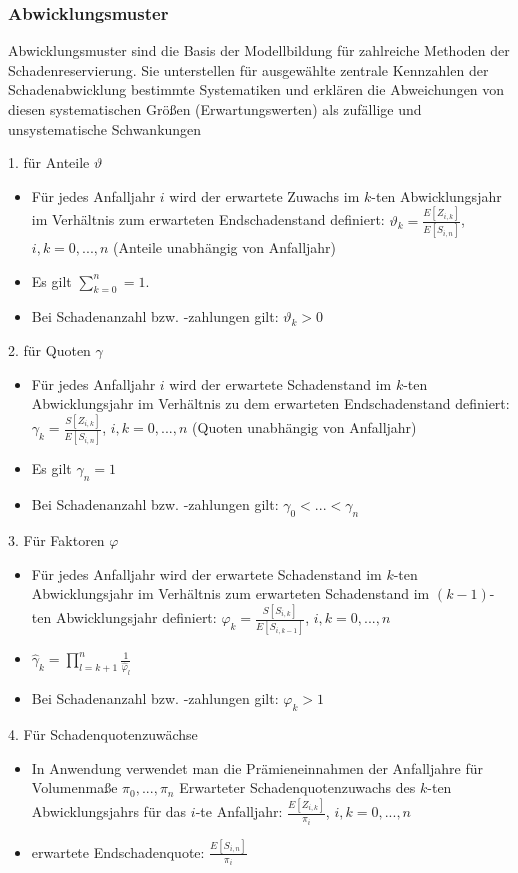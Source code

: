 \documentclass[12pt]{report}
\theoremstyle{dotless}
\theoremstyle{definition}
\begin{document}
\subsubsection{Abwicklungsmuster}

Abwicklungsmuster sind die Basis der Modellbildung für zahlreiche
Methoden der Schadenreservierung. Sie unterstellen für ausgewählte zentrale Kennzahlen der Schadenabwicklung bestimmte Systematiken und erklären
die Abweichungen von diesen systematischen Größen (Erwartungswerten) als
zufällige und unsystematische Schwankungen

1. für Anteile $\vartheta$
\begin{itemize}
\item Für jedes Anfalljahr $i$ wird der erwartete Zuwachs im $k$-ten Abwicklungsjahr im Verhältnis zum erwarteten Endschadenstand definiert: $\vartheta_k = \frac{E[Z_{i,k}]}{E[S_{i,n}]}$, $i,k=0,...,n$ (Anteile unabhängig von Anfalljahr)
\item Es gilt $\sum_{k=0}^n =1$.
\item Bei Schadenanzahl bzw. -zahlungen gilt: $\vartheta_k >0$
\end{itemize}
2. für Quoten $\gamma$
\begin{itemize}
\item Für jedes Anfalljahr $i$ wird der erwartete Schadenstand im $k$-ten Abwicklungsjahr im Verhältnis zu dem erwarteten Endschadenstand definiert: $\gamma_k = \frac{S[Z_{i,k}]}{E[S_{i,n}]}$, $i,k=0,...,n$ (Quoten unabhängig von Anfalljahr)
\item Es gilt $\gamma_n=1$
\item Bei Schadenanzahl bzw. -zahlungen gilt: $\gamma_0 < ... < \gamma_n$
\end{itemize}
3. Für Faktoren $\varphi$
\begin{itemize}
\item Für jedes Anfalljahr wird der erwartete Schadenstand im $k$-ten Abwicklungsjahr im Verhältnis zum erwarteten Schadenstand im $(k-1)$-ten Abwicklungsjahr definiert: $\varphi_k = \frac{S[S_{i,k}]}{E[S_{i,k-1}]}$, $i,k=0,...,n$
\item $\hat{\gamma}_k = \prod_{l=k+1}^n \frac{1}{\hat{\varphi}_l}$
\item Bei Schadenanzahl bzw. -zahlungen gilt: $\varphi_k >1$
\end{itemize}
4. Für Schadenquotenzuwächse
\begin{itemize}
\item In Anwendung verwendet man die Prämieneinnahmen der Anfalljahre für Volumenmaße $\pi_0,..., \pi_n$
Erwarteter Schadenquotenzuwachs des $k$-ten Abwicklungsjahrs für das $i$-te Anfalljahr: $\frac{E[Z_{i,k}]}{\pi_i}$, $i,k=0,...,n$
\item erwartete Endschadenquote: $\frac{E[S_{i,n}]}{\pi_i}$
\end{itemize}
\end{document}
